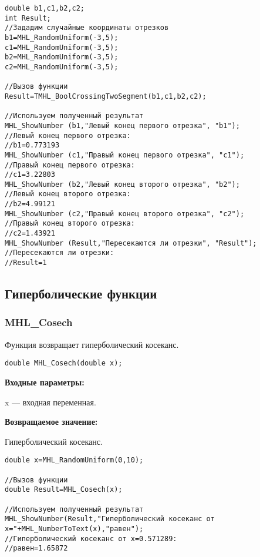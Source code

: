 \documentclass[a4paper,12pt]{article}
\begin{document}
\begin{lstlisting}[label=code_use_TMHL_BoolCrossingTwoSegment,caption=Пример использования]
double b1,c1,b2,c2;
int Result;
//Зададим случайные координаты отрезков
b1=MHL_RandomUniform(-3,5);
c1=MHL_RandomUniform(-3,5);
b2=MHL_RandomUniform(-3,5);
c2=MHL_RandomUniform(-3,5);

//Вызов функции
Result=TMHL_BoolCrossingTwoSegment(b1,c1,b2,c2);

//Используем полученный результат
MHL_ShowNumber (b1,"Левый конец первого отрезка", "b1");
//Левый конец первого отрезка:
//b1=0.773193
MHL_ShowNumber (c1,"Правый конец первого отрезка", "c1");
//Правый конец первого отрезка:
//c1=3.22803
MHL_ShowNumber (b2,"Левый конец второго отрезка", "b2");
//Левый конец второго отрезка:
//b2=4.99121
MHL_ShowNumber (c2,"Правый конец второго отрезка", "c2");
//Правый конец второго отрезка:
//c2=1.43921
MHL_ShowNumber (Result,"Пересекаются ли отрезки", "Result");
//Пересекаются ли отрезки:
//Result=1
\end{lstlisting}

\subsection{Гиперболические функции}

\subsubsection{MHL\_Cosech}\label{MHL_Cosech}

Функция возвращает гиперболический косеканс.


\begin{lstlisting}[label=code_syntax_MHL_Cosech,caption=Синтаксис]
double MHL_Cosech(double x);
\end{lstlisting}

\textbf{Входные параметры:}

 x --- входная переменная.

\textbf{Возвращаемое значение:}

Гиперболический косеканс.


\begin{lstlisting}[label=code_use_MHL_Cosech,caption=Пример использования]
double x=MHL_RandomUniform(0,10);

//Вызов функции
double Result=MHL_Cosech(x);

//Используем полученный результат
MHL_ShowNumber(Result,"Гиперболический косеканс от x="+MHL_NumberToText(x),"равен");
//Гиперболический косеканс от x=0.571289:
//равен=1.65872
\end{lstlisting}
\end{document}
